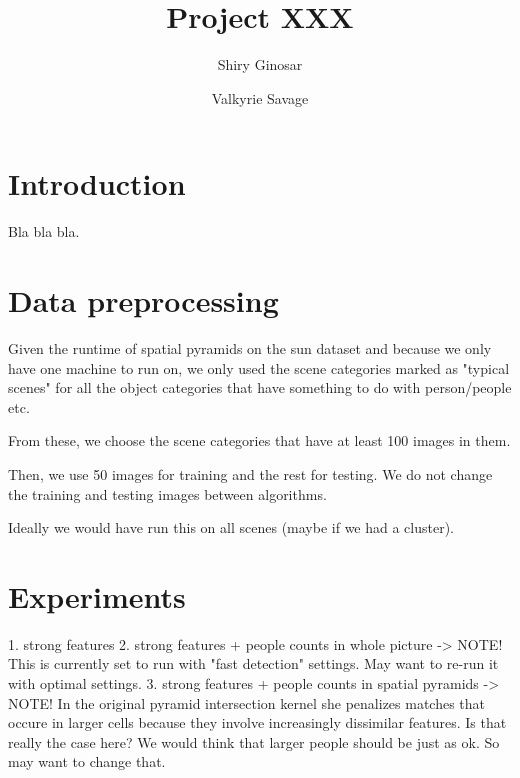 \documentclass[11pt]{article}
\begin{document}
\title{Project XXX}
\author{Shiry Ginosar \and Valkyrie Savage}

\maketitle


\section{Introduction}
Bla bla bla.

\section{Data preprocessing}
Given the runtime of spatial pyramids on the sun dataset and because we only have one machine to run on, we only used the scene categories marked as "typical scenes" for all the object categories that have something to do with person/people etc.

From these, we choose the scene categories that have at least 100 images in them.

Then, we use 50 images for training and the rest for testing. We do not change the training and testing images between algorithms.

Ideally we would have run this on all scenes (maybe if we had a cluster).

\section{Experiments}
1. strong features
2. strong features + people counts in whole picture -> NOTE! This is currently set to run with "fast detection" settings. May want to re-run it with optimal settings.
3. strong features + people counts in spatial pyramids -> NOTE! In the original pyramid intersection kernel she penalizes matches that occure in larger cells because they involve increasingly dissimilar features. Is that really the case here? We would think that larger people should be just as ok. So may want to change that.



\end{document}
